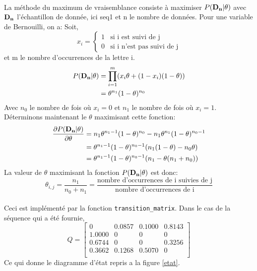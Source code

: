 \documentclass[11pt]{report}
\begin{document}
\paragraph{}
La méthode du maximum de vraisemblance consiste à maximiser $P(\bf{D}_n|\theta)$ avec $\bf{D}_n$ l'échantillon de donnée, ici seq1 et n le nombre de données. Pour une variable de Bernouilli, on a: Soit,\\ 
$$
\mbox{} x_i = \left\{
    \begin{array}{ll}
        1 & \mbox{si i est suivi de j} \\
        0 & \mbox{si i n'est pas suivi de j}
    \end{array}
\right.
$$
et m le nombre d’occurrences de la lettre i.
\begin{align*}
P(\bf{D}_n|\theta) &= \prod_{i = 1}^{m} (x_i \theta +(1-x_i)(1-\theta)) \\
                   &= \theta^{n_1} (1-\theta)^{n_0}
\end{align*}
Avec $n_0$ le nombre de fois où $x_i = 0$ et $n_1$ le nombre de fois où $x_i = 1$. Déterminons maintenant le $\theta$ maximisant cette fonction:
\begin{align*}
\frac{\partial P(\bf{D}_n|\theta)}{\partial \theta} 
&= n_1 \theta^{n_1-1} (1-\theta)^{n_0} - n_1\theta^{n_1} (1-\theta)^{n_0-1} \\
&= \theta^{n_1-1} (1-\theta)^{n_0-1} (n_1 (1-\theta) - n_0 \theta) \\
&= \theta^{n_1-1} (1-\theta)^{n_0-1} (n_1 - \theta (n_1 + n_0))
\end{align*}
La valeur de $\theta$ maximisant la fonction $P(\bf{D}_n|\theta)$ est donc:
$$ \theta_{i,j} = \frac{n_1}{n_0+n_1} = \frac{\mbox{nombre d'occurrences de i suivies de j}}{\mbox{nombre d'occurrences de i}} $$\\
Ceci est implémenté par la fonction \texttt{transition\_matrix}. Dans le cas de la séquence qui a été fournie,
$$Q =
\begin{bmatrix}
0 & 0.0857 & 0.1000 & 0.8143 \\
1.0000 & 0 & 0 & 0 \\
0.6744 & 0 & 0 & 0.3256 \\
0.3662 & 0.1268 & 0.5070 & 0 \\
\end{bmatrix}
$$ 
Ce qui donne le diagramme d'état repris a la figure \ref{etat}.\\
\end{document}
